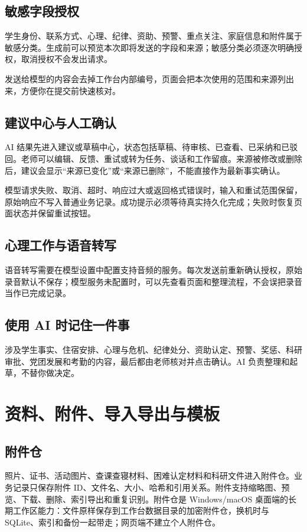 \documentclass[UTF8,zihao=-4,oneside]{ctexrep}
\begin{document}
\section{敏感字段授权}

学生身份、联系方式、心理、纪律、资助、预警、重点关注、家庭信息和附件属于敏感分类。生成前可以预览本次即将发送的字段和来源；敏感分类必须逐次明确授权，取消授权不会发出请求。

发送给模型的内容会去掉工作台内部编号，页面会把本次使用的范围和来源列出来，方便你在提交前快速核对。

\section{建议中心与人工确认}

AI 结果先进入建议或草稿中心，状态包括草稿、待审核、已查看、已采纳和已驳回。老师可以编辑、反馈、重试或转为任务、谈话和工作留痕。来源被修改或删除后，建议会显示“来源已变化”或“来源已删除”，不能直接作为最新事实确认。

模型请求失败、取消、超时、响应过大或返回格式错误时，输入和重试范围保留，原始响应不写入普通业务记录。成功提示必须等待真实持久化完成；失败时恢复页面状态并保留重试按钮。

\section{心理工作与语音转写}

语音转写需要在模型设置中配置支持音频的服务。每次发送前重新确认授权，原始录音默认不保存；模型服务未配置时，可以先查看页面和整理流程，不会误把录音当作已完成记录。

\section{使用 AI 时记住一件事}

涉及学生事实、住宿安排、心理与危机、纪律处分、资助认定、预警、奖惩、科研审批、党团发展和考勤的内容，最后都由老师核对并点击确认。AI 负责整理和起草，不替你做决定。

\chapter{资料、附件、导入导出与模板}

\section{附件仓}

照片、证书、活动图片、查课查寝材料、困难认定材料和科研文件进入附件仓。业务记录只保存附件 ID、文件名、大小、哈希和引用关系。附件支持缩略图、预览、下载、删除、索引导出和重复识别。附件仓是 Windows/macOS 桌面端的长期工作区能力：文件原样保存到工作台数据目录的加密附件仓，换机时与 SQLite、索引和备份一起带走；网页端不建立个人附件仓。
\end{document}
